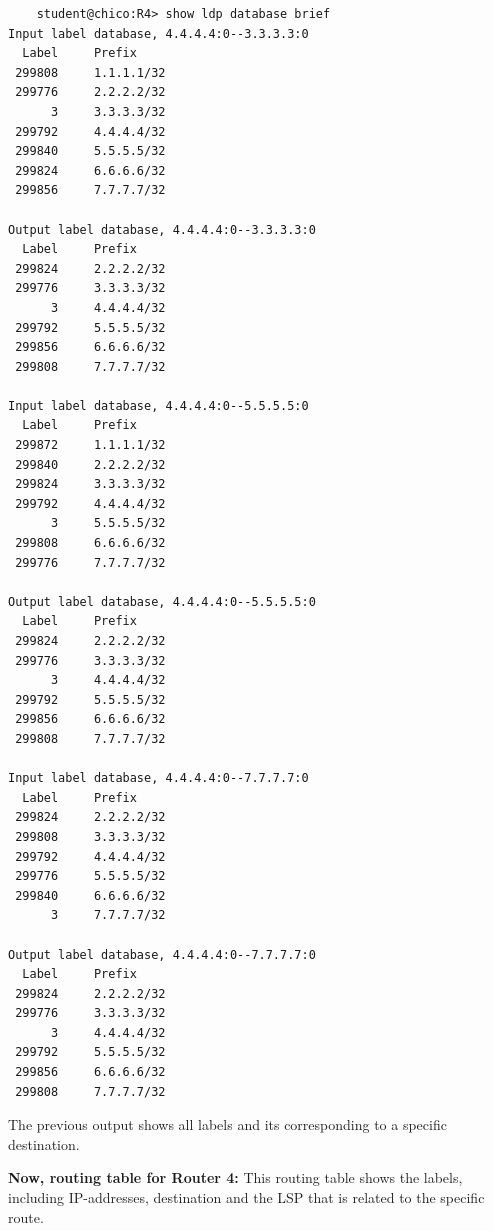 \documentclass[a4paper]{article}
\begin{document}
\begin{verbatim}
    student@chico:R4> show ldp database brief 
Input label database, 4.4.4.4:0--3.3.3.3:0
  Label     Prefix
 299808     1.1.1.1/32
 299776     2.2.2.2/32
      3     3.3.3.3/32
 299792     4.4.4.4/32
 299840     5.5.5.5/32
 299824     6.6.6.6/32
 299856     7.7.7.7/32

Output label database, 4.4.4.4:0--3.3.3.3:0
  Label     Prefix
 299824     2.2.2.2/32
 299776     3.3.3.3/32
      3     4.4.4.4/32
 299792     5.5.5.5/32
 299856     6.6.6.6/32
 299808     7.7.7.7/32

Input label database, 4.4.4.4:0--5.5.5.5:0
  Label     Prefix
 299872     1.1.1.1/32
 299840     2.2.2.2/32
 299824     3.3.3.3/32                  
 299792     4.4.4.4/32
      3     5.5.5.5/32
 299808     6.6.6.6/32
 299776     7.7.7.7/32

Output label database, 4.4.4.4:0--5.5.5.5:0
  Label     Prefix
 299824     2.2.2.2/32
 299776     3.3.3.3/32
      3     4.4.4.4/32
 299792     5.5.5.5/32
 299856     6.6.6.6/32
 299808     7.7.7.7/32

Input label database, 4.4.4.4:0--7.7.7.7:0
  Label     Prefix
 299824     2.2.2.2/32
 299808     3.3.3.3/32
 299792     4.4.4.4/32
 299776     5.5.5.5/32
 299840     6.6.6.6/32
      3     7.7.7.7/32
                                        
Output label database, 4.4.4.4:0--7.7.7.7:0
  Label     Prefix
 299824     2.2.2.2/32
 299776     3.3.3.3/32
      3     4.4.4.4/32
 299792     5.5.5.5/32
 299856     6.6.6.6/32
 299808     7.7.7.7/32
\end{verbatim}

The previous output shows all labels and its corresponding to a specific destination.


\textbf{Now, routing table for Router 4:} This routing table shows the labels, including IP-addresses, destination and the LSP that is related to the specific route.
\end{document}
